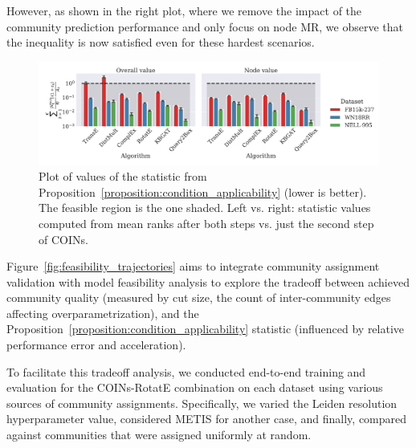 However, as shown in the right plot, where we remove the impact of the community prediction performance and only focus on node MR, we observe that the inequality is now satisfied even for these hardest scenarios.

\begin{figure}[H]
\begin{center}
\includegraphics[width=\linewidth]{figures/coins/feasibility_statistic}
\end{center}
\caption[Plot of the values of the COINs feasibility statistic.]{Plot of values of the statistic from Proposition~\ref{proposition:condition_applicability} (lower is better). The feasible region is the one shaded. Left vs. right: statistic values computed from mean ranks after both steps vs. just the second step of COINs.}
\label{fig:feasibility_statistic}
\end{figure}


Figure~\ref{fig:feasibility_trajectories} aims to integrate community assignment validation with model feasibility analysis to explore the tradeoff between achieved community quality (measured by cut size, the count of inter-community edges affecting overparametrization), and the Proposition~\ref{proposition:condition_applicability} statistic (influenced by relative performance error and acceleration). 

To facilitate this tradeoff analysis, we conducted end-to-end training and evaluation for the COINs-RotatE combination on each dataset using various sources of community assignments. Specifically, we varied the Leiden resolution hyperparameter value, considered METIS for another case, and finally, compared against communities that were assigned uniformly at random.

